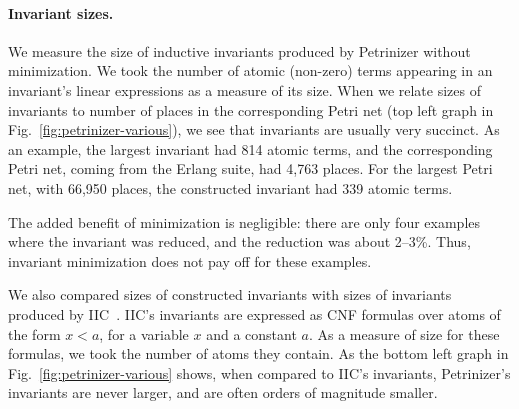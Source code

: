 \paragraph{Invariant sizes.} 
We measure the size of inductive invariants produced by Pe\-tri\-ni\-zer without
minimization.
We took the number of atomic (non-zero) terms appearing in an invariant's linear expressions
as a measure of its size. When we relate sizes of invariants to number of places
in the corresponding Petri net (top left graph in Fig.~\ref{fig:petrinizer-various}), we
see that invariants are usually very succinct. As an example, the
largest invariant had 814 atomic terms, and the corresponding Petri net, coming
from the Erlang suite, had 4,763 places. For the largest Petri net, 
with 66,950 places, the constructed invariant had 339 atomic
terms.

The added benefit of minimization is negligible: there are only four examples where the invariant
was reduced, and the reduction was about 2–3\%. 
Thus, invariant minimization does not pay off for these examples.

We also compared sizes of constructed invariants with
sizes of invariants produced by IIC~\cite{KloosMNP13}. IIC's invariants
are expressed as CNF formulas over atoms of the form $x<a$,
for a variable $x$ and a constant $a$. As a measure of size for these formulas,
we took the number of atoms they contain. As the bottom left graph in
Fig.~\ref{fig:petrinizer-various} shows, when compared to IIC's invariants, Petrinizer's invariants
are never larger, and are often orders of magnitude smaller.

